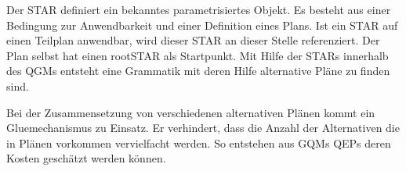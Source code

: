 Der \ac{STAR} definiert ein bekanntes parametrisiertes Objekt. Es besteht aus einer Bedingung zur Anwendbarkeit und einer Definition  eines Plans. Ist ein STAR auf einen Teilplan anwendbar, wird dieser STAR an dieser Stelle referenziert. Der Plan selbst hat einen rootSTAR als Startpunkt. Mit Hilfe der STARs innerhalb des \ac{QGM}s entsteht  eine Grammatik mit deren Hilfe alternative Pläne zu finden sind. 

Bei der Zusammensetzung von verschiedenen alternativen Plänen kommt ein Gluemechanismus zu Einsatz. Er verhindert, dass die Anzahl der Alternativen die in Plänen vorkommen vervielfacht werden. So entstehen aus GQMs QEPs deren Kosten geschätzt werden können.

